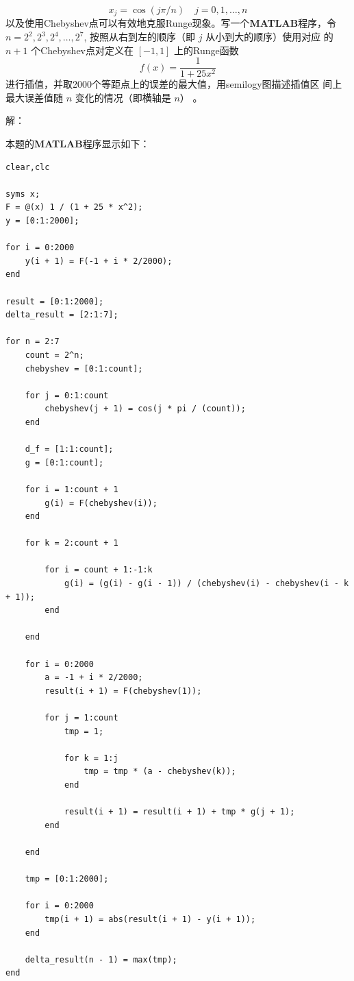 \documentclass[12pt,a4paper,UTF8]{ctexart}
\theoremstyle{nonumberplain}
\begin{document}
\begin{enumerate}
\begin{enumerate}
$$                        x_{j}=\cos (j \pi / n) \quad j=0,1, \ldots, n
                    $$
                    以及使用Chebyshev点可以有效地克服Runge现象。写一个\textbf{MATLAB}程序，令 $n=2^{2}, 2^{3}, 2^{4}, \ldots, 2^{7}$, 按照从右到左的顺序（即 $j$ 从小到大的顺序）使用对应
                    的 $n+1$ 个Chebyshev点对定义在 $[-1,1]$ 上的Runge函数
                    $$
                        f(x)=\frac{1}{1+25 x^{2}}
                    $$
                    进行插值，并取2000个等距点上的误差的最大值，用semilogy图描述插值区
                    间上最大误差值随 $n$ 变化的情况（即横轴是 $n$） 。
                    \par 解：
                    \par 本题的\textbf{MATLAB}程序显示如下：
                    \begin{lstlisting}[frame=single]
clear,clc

syms x;
F = @(x) 1 / (1 + 25 * x^2);
y = [0:1:2000];

for i = 0:2000
    y(i + 1) = F(-1 + i * 2/2000);
end

result = [0:1:2000];
delta_result = [2:1:7];

for n = 2:7
    count = 2^n;
    chebyshev = [0:1:count];

    for j = 0:1:count
        chebyshev(j + 1) = cos(j * pi / (count));
    end

    d_f = [1:1:count];
    g = [0:1:count];

    for i = 1:count + 1
        g(i) = F(chebyshev(i));
    end

    for k = 2:count + 1

        for i = count + 1:-1:k
            g(i) = (g(i) - g(i - 1)) / (chebyshev(i) - chebyshev(i - k + 1));
        end

    end

    for i = 0:2000
        a = -1 + i * 2/2000;
        result(i + 1) = F(chebyshev(1));

        for j = 1:count
            tmp = 1;

            for k = 1:j
                tmp = tmp * (a - chebyshev(k));
            end

            result(i + 1) = result(i + 1) + tmp * g(j + 1);
        end

    end

    tmp = [0:1:2000];

    for i = 0:2000
        tmp(i + 1) = abs(result(i + 1) - y(i + 1));
    end

    delta_result(n - 1) = max(tmp);
end


\end{lstlisting}
\end{enumerate}
\end{enumerate}
\end{document}
